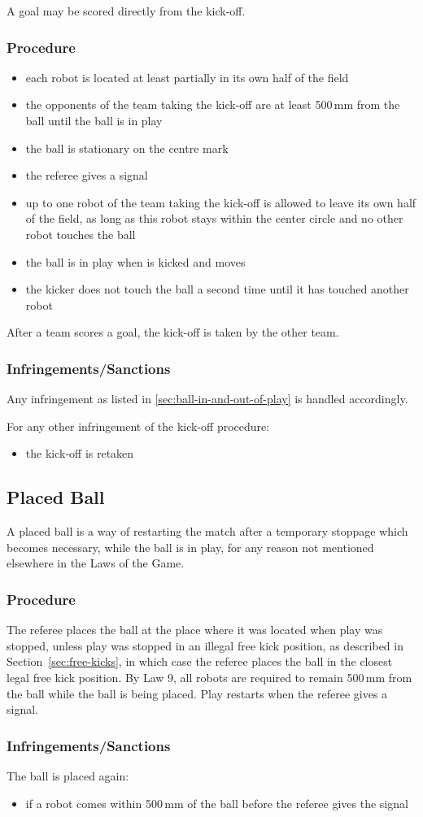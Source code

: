 A goal may be scored directly from the kick-off.

\subsubsection{Procedure}
\begin{itemize}
\item each robot is located at least partially in its own half of the field
\item the opponents of the team taking the kick-off are at least 500\,mm from the ball until the ball is in play
\item the ball is stationary on the centre mark
\item the referee gives a signal
\item up to one robot of the team taking the kick-off is allowed to leave its own half of the field,
as long as this robot stays within the center circle and no other robot touches the ball
\item the ball is in play when is kicked and moves
\item the kicker does not touch the ball a second time until it has touched another robot
\end{itemize}

After a team scores a goal, the kick-off is taken by the other team.

\subsubsection{Infringements/Sanctions}
Any infringement as listed in \autoref{sec:ball-in-and-out-of-play} is handled accordingly.

For any other infringement of the kick-off procedure:
\begin{itemize}
\item the kick-off is retaken
\end{itemize}

\subsection{Placed Ball}
\label{sec:placedBall}
A placed ball is a way of restarting the match after a temporary stoppage which becomes necessary, while the ball is in play, for any reason not mentioned elsewhere in the Laws of the Game.

\subsubsection{Procedure}
The referee places the ball at the place where it was located when play was stopped, unless
play was stopped in an illegal free kick position, as described in Section~\ref{sec:free-kicks},
in which case the referee places the ball in the closest legal free kick position.
By Law 9, all robots are required to remain 500\,mm from the ball while the ball is being placed.
Play restarts when the referee gives a signal.

\subsubsection{Infringements/Sanctions}
The ball is placed again:
\begin{itemize}
\item if a robot comes within 500\,mm of the ball before the referee gives the signal
\end{itemize}
